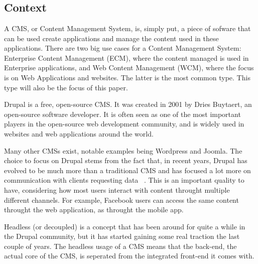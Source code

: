 
\chapter{}
\label{ch:inleiding}

\section{Context}
A CMS, or Content Management System, is, simply put, a piece of sofware that can be used create applications and manage the content used in these applications. There are two big use cases for a Content Management System: Enterprise Content Management (ECM), where the content managed is used in Enterprise applications, and Web Content Management (WCM), where the focus is on Web Applications and websites. The latter is the most common type. This type will also be the focus of this paper.

Drupal is a free, open-source CMS. It was created in 2001 by Dries Buytaert, an open-source software developer. It is often seen as one of the most important players in the open-source web development community, and is widely used in websites and web applications around the world.

Many other CMSs exist, notable examples being Wordpress and Joomla. The choice to focus on Drupal stems from the fact that, in recent years, Drupal has evolved to be much more than a traditional CMS and has focused a lot more on communication with clients requesting data ~\autocite{So2018}. This is an important quality to have, considering how most users interact with content throught multiple different channels. For example, Facebook users can access the same content throught the web application, as throught the mobile app.

Headless (or decoupled) is a concept that has been around for quite a while in the Drupal community, but it has started gaining some real traction the last couple of years. The headless usage of a CMS means that the back-end, the actual core of the CMS, is seperated from the integrated front-end it comes with. 

\section{}
\label{sec:probleemstelling}


